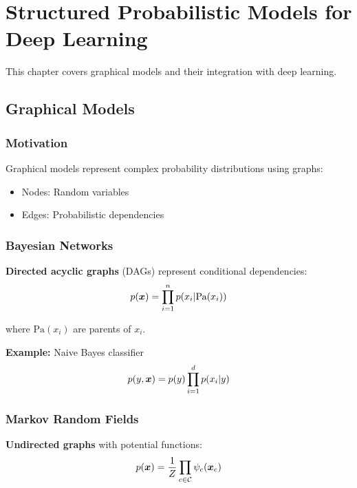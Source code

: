 
\chapter{Structured Probabilistic Models for Deep Learning}
\label{chap:structured-probabilistic-models}

This chapter covers graphical models and their integration with deep learning.

\section{Graphical Models}
\label{sec:graphical-models}

\subsection{Motivation}

Graphical models represent complex probability distributions using graphs:
\begin{itemize}
    \item Nodes: Random variables
    \item Edges: Probabilistic dependencies
\end{itemize}

\subsection{Bayesian Networks}

\textbf{Directed acyclic graphs} (DAGs) represent conditional dependencies:
\begin{equation}
p(\boldsymbol{x}) = \prod_{i=1}^{n} p(x_i | \text{Pa}(x_i))
\end{equation}

where $\text{Pa}(x_i)$ are parents of $x_i$.

\textbf{Example:} Naive Bayes classifier
\begin{equation}
p(y, \boldsymbol{x}) = p(y) \prod_{i=1}^{d} p(x_i|y)
\end{equation}

\subsection{Markov Random Fields}

\textbf{Undirected graphs} with potential functions:
\begin{equation}
p(\boldsymbol{x}) = \frac{1}{Z} \prod_{c \in \mathcal{C}} \psi_c(\boldsymbol{x}_c)
\end{equation}

